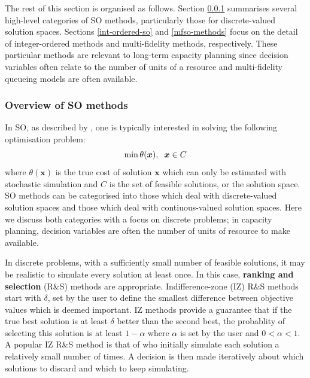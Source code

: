 \documentclass[12pt,a4paper]{article}
\begin{document}
The rest of this section is organised as follows. Section \ref{lit-review-so} summarises several high-level categories of SO methods, particularly those for discrete-valued solution spaces. Sections \ref{int-ordered-so} and \ref{mfso-methods} focus on the detail of integer-ordered methods and multi-fidelity methods, respectively. These particular methods are relevant to long-term capacity planning since decision variables often relate to the number of units of a resource and multi-fidelity queueing models are often available. 

\subsubsection{Overview of SO methods}\label{lit-review-so}

In SO, as described by \cite{nelson2021foundations}, one is typically interested in solving the following optimisation problem: 
%
\begin{equation}\label{SO_general}
    \min \theta(\boldsymbol{x}), \hspace{0.2cm} \boldsymbol{x} \in C
\end{equation}
%
where $\theta(\boldsymbol{x})$ is the true cost of solution $\boldsymbol{x}$ which can only be estimated with stochastic simulation and $C$ is the set of feasible solutions, or the solution space. SO methods can be categorised into those which deal with discrete-valued solution spaces and those which deal with contiuous-valued solution spaces. Here we discuss both categories with a focus on discrete problems; in capacity planning, decision variables are often the number of units of resource to make available.

In discrete problems, with a sufficiently small number of feasible solutions, it may be realistic to simulate every solution at least once. In this case, \textbf{ranking and selection} (R\&S) methods are appropriate. Indifference-zone (IZ) R\&S methods start with $\delta$, set by the user to define the smallest difference between objective values which is deemed important. IZ methods provide a guarantee that if the true best solution is at least $\delta$ better than the second best, the probablity of selecting this solution is at least $1-\alpha$ where $\alpha$ is set by the user and $0<\alpha<1$. A popular IZ R\&S method is that of \cite{kim2001fully} who initially simulate each solution a relatively small number of times. A decision is then made iteratively about which solutions to discard and which to keep simulating.
\end{document}
